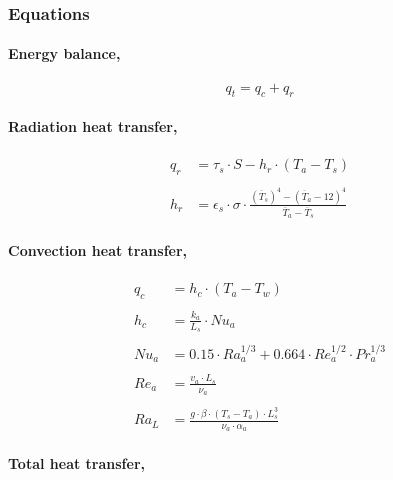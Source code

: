 \documentclass[11pt]{article}
\begin{document}
    \hypertarget{equations}{%
\subsubsection{Equations}\label{equations}}

\hypertarget{energy-balance}{%
\paragraph{Energy balance,}\label{energy-balance}}

\[ q_t = q_c + q_r \]

\hypertarget{radiation-heat-transfer}{%
\paragraph{Radiation heat transfer,}\label{radiation-heat-transfer}}

\begin{align*}
  q_r &= \tau_s\cdot S - h_r \cdot (T_a - T_s) \\
\\
  h_r &= \epsilon_s\cdot \sigma\cdot \frac{(\overline T_s)^4 - (\overline T_a - 12)^4}{\overline T_a - \overline T_s}
\end{align*}

\hypertarget{convection-heat-transfer}{%
\paragraph{Convection heat transfer,}\label{convection-heat-transfer}}

\begin{align*}
  q_c &= h_c\cdot (T_a - T_w) \\
\\
  h_c  &= \frac{k_a}{L_s}\cdot Nu_a \\
\\
  Nu_a &= 0.15\cdot Ra_a^{1/3} + 0.664\cdot Re_a^{1/2}\cdot Pr_a^{1/3} \\
\\
  Re_a &= \frac{v_a\cdot L_s}{\nu_a} \\
\\
  Ra_L &= \frac{g\cdot \beta\cdot (T_s - T_a)\cdot L_s^3}{\nu_a\cdot \alpha_a}
\end{align*}

\hypertarget{total-heat-transfer}{%
\paragraph{Total heat transfer,}\label{total-heat-transfer}}
\end{document}
